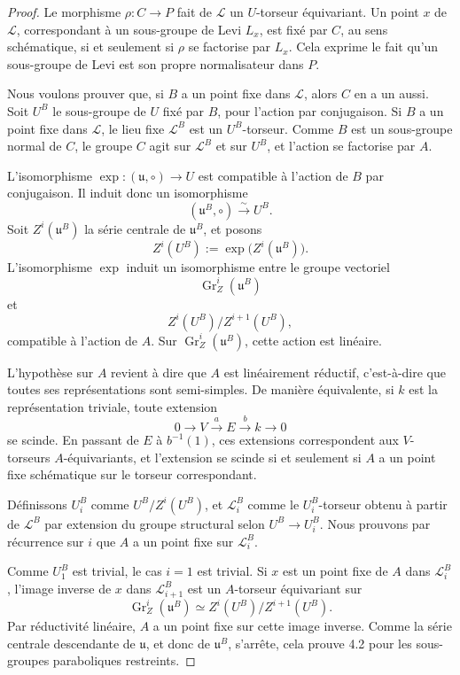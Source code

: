\documentclass[11pt]{article}
\begin{document}
\begin{proof}
Le morphisme \(\rho:C\to P\) fait de \(\mathcal L\) un \(U\)-torseur équivariant. Un
point \(x\) de \(\mathcal L\), correspondant à un sous-groupe de Levi \(L_x\), est fixé
par \(C\), au sens schématique, si et seulement si \(\rho\) se factorise par \(L_x\).
Cela exprime le fait qu'un sous-groupe de Levi est son propre normalisateur dans \(P\).

Nous voulons prouver que, si \(B\) a un point fixe dans \(\mathcal L\), alors \(C\) en a
un aussi. Soit \(U^B\) le sous-groupe de \(U\) fixé par \(B\), pour l'action par
conjugaison. Si \(B\) a un point fixe dans \(\mathcal L\), le lieu fixe
\(\mathcal L^B\) est un \(U^B\)-torseur. Comme \(B\) est un sous-groupe normal de
\(C\), le groupe \(C\) agit sur \(\mathcal L^B\) et sur \(U^B\), et l'action se factorise
par \(A\).

L'isomorphisme \(\exp:(\mathfrak u,\circ)\to U\) est compatible à l'action de \(B\) par
conjugaison. Il induit donc un isomorphisme
\[
  (\mathfrak u^B,\circ)\xrightarrow{\sim}U^B.
\]
Soit \(Z^i(\mathfrak u^B)\) la série centrale de \(\mathfrak u^B\), et posons
\[
  Z^i(U^B):=\exp\bigl(Z^i(\mathfrak u^B)\bigr).
\]
L'isomorphisme \(\exp\) induit un isomorphisme entre le groupe vectoriel
\[
  \operatorname{Gr}_{Z}^{i}(\mathfrak u^B)
\]
et
\[
  Z^i(U^B)/Z^{i+1}(U^B),
\]
compatible à l'action de \(A\). Sur
\(\operatorname{Gr}_{Z}^{i}(\mathfrak u^B)\), cette action est linéaire.

L'hypothèse sur \(A\) revient à dire que \(A\) est linéairement réductif, c'est-à-dire
que toutes ses représentations sont semi-simples. De manière équivalente, si \(k\) est
la représentation triviale, toute extension
\begin{equation}
  0\longrightarrow V\stackrel{a}{\longrightarrow}E
  \stackrel{b}{\longrightarrow}k\longrightarrow 0
  \tag{4.2.3}
\end{equation}
se scinde. En passant de \(E\) à \(b^{-1}(1)\), ces extensions correspondent aux
\(V\)-torseurs \(A\)-équivariants, et l'extension se scinde si et seulement si \(A\) a un
point fixe schématique sur le torseur correspondant.

Définissons \(U_i^B\) comme \(U^B/Z^i(U^B)\), et \(\mathcal L_i^B\) comme le
\(U_i^B\)-torseur obtenu à partir de \(\mathcal L^B\) par extension du groupe structural
selon \(U^B\to U_i^B\). Nous prouvons par récurrence sur \(i\) que \(A\) a un point fixe
sur \(\mathcal L_i^B\).

Comme \(U_1^B\) est trivial, le cas \(i=1\) est trivial. Si \(x\) est un point fixe de
\(A\) dans \(\mathcal L_i^B\), l'image inverse de \(x\) dans \(\mathcal L_{i+1}^B\) est
un \(A\)-torseur équivariant sur
\[
  \operatorname{Gr}_{Z}^{i}(\mathfrak u^B)
  \simeq Z^i(U^B)/Z^{i+1}(U^B).
\]
Par réductivité linéaire, \(A\) a un point fixe sur cette image inverse. Comme la série
centrale descendante de \(\mathfrak u\), et donc de \(\mathfrak u^B\), s'arrête, cela
prouve 4.2 pour les sous-groupes paraboliques restreints.


\end{proof}
\end{document}
